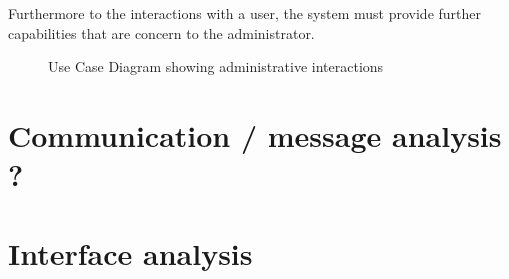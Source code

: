 Furthermore to the interactions with a user, the system must provide further capabilities that are  concern to the administrator.


\begin{figure}[H]
	\centering
	\caption{Use Case Diagram showing administrative interactions}
	\label{use_case:admin}
\end{figure}

\section{Communication / message analysis ?}

\section{Interface analysis}
